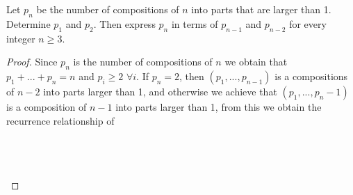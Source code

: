 \documentclass[12pt]{article}
\newenvironment{problem}[2][Problem]{\begin{trivlist}
\item[\hskip \labelsep {\bfseries #1}\hskip \labelsep {\bfseries #2.}]}{\end{trivlist}}
\begin{document}
\begin{problem}{5}
Let $p_n$ be the number of compositions of $n$ into parts that are larger than 1. Determine $p_1$ and $p_2$. Then express $p_n$ in terms of $p_{n-1}$ and $p_{n-2}$ for every integer $n \geq 3$.
\end{problem}

\begin{proof}
Since $p_n$ is the number of compositions of $n$ we obtain that $p_1+...+p_n=n$ and $p_i \geq 2$ $\forall i$. If $p_n = 2$, then $(p_1,...,p_{n-1})$ is a compositions of $n-2$ into parts larger than 1, and otherwise we achieve that $(p_1,...,p_n - 1)$ is a composition of $n-1$ into parts larger than 1, from this we obtain the recurrence relationship of \\ \\
\centerline{} \\ \\

\end{proof}


 
\end{document}
